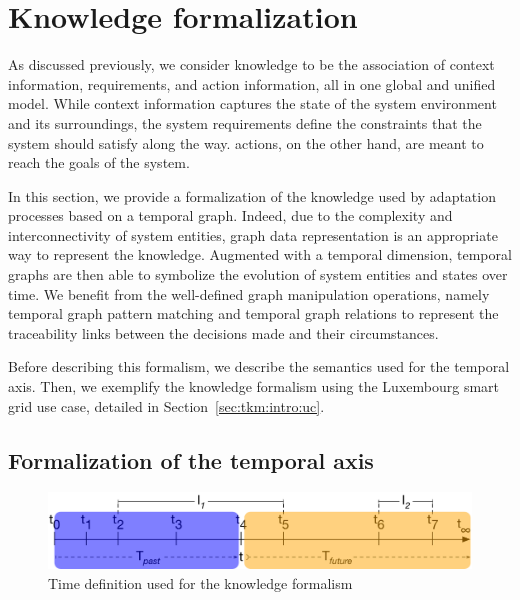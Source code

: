 \section{Knowledge formalization}
\label{sec:tkm:k-formalism}
 
As discussed previously, we consider \gls{knowledge} to be the association of \gls{context} information, \glspl{requirement}, and \gls{action} information, all in one global and unified model.
 While \gls{context} information captures the state of the system environment and its surroundings, the system \glspl{requirement} define the constraints that the system should satisfy along the way. 
 \Glspl{action}, on the other hand, are meant to reach the goals of the system.
  
 In this section, we provide a formalization of the \gls{knowledge} used by adaptation processes based on a temporal graph. 
Indeed, due to the complexity and interconnectivity of system entities, graph data representation is an appropriate way to represent the \gls{knowledge}. 
Augmented with a temporal dimension, temporal graphs are then able to symbolize the evolution of system entities and states over time. 
We benefit from the well-defined graph manipulation operations, namely temporal graph pattern matching and temporal graph relations to represent the traceability links between the \glspl{decision} made and their \glspl{circumstance}.

Before describing this formalism, we describe the semantics used for the temporal axis.
Then, we exemplify the knowledge formalism using the Luxembourg smart grid use case, detailed in Section~\ref{sec:tkm:intro:uc}.

\subsection{Formalization of the temporal axis}
\label{sec:tkm:timeDef}

\begin{figure}
   \centering
	\includegraphics[width=\textwidth]{img/chapt-tkm/formalism/formalismeTime}
	\caption{Time definition used for the knowledge formalism}
	\label{fig:tkm:formalismeTime}
\end{figure}

